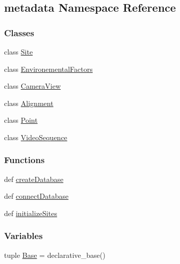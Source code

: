 \hypertarget{namespacemetadata}{\subsection{metadata Namespace Reference}
\label{namespacemetadata}
}
\subsubsection*{Classes}
\begin{DoxyCompactItemize}
\item 
class \hyperlink{classmetadata_1_1Site}{Site}
\item 
class \hyperlink{classmetadata_1_1EnvironementalFactors}{Environemental\-Factors}
\item 
class \hyperlink{classmetadata_1_1CameraView}{Camera\-View}
\item 
class \hyperlink{classmetadata_1_1Alignment}{Alignment}
\item 
class \hyperlink{classmetadata_1_1Point}{Point}
\item 
class \hyperlink{classmetadata_1_1VideoSequence}{Video\-Sequence}
\end{DoxyCompactItemize}
\subsubsection*{Functions}
\begin{DoxyCompactItemize}
\item 
def \hyperlink{namespacemetadata_a361dd1fb715292d9c26b981cd4a7e31f}{create\-Database}
\item 
def \hyperlink{namespacemetadata_ae7a0cb1c3db332417e92f468e96296dc}{connect\-Database}
\item 
def \hyperlink{namespacemetadata_a1201f4ceab09cf477bcd5cb58afdb32e}{initialize\-Sites}
\end{DoxyCompactItemize}
\subsubsection*{Variables}
\begin{DoxyCompactItemize}
\item 
tuple \hyperlink{namespacemetadata_afb4cda46e96551cec78005b2e9e253d5}{Base} = declarative\-\_\-base()
\end{DoxyCompactItemize}


